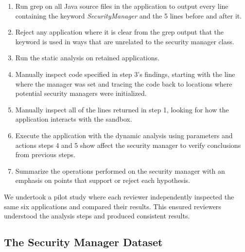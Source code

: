 \documentclass{sig-alternate}
\begin{document}
\begin{enumerate}
\item Run grep on all Java source files in the application
to output every line containing the keyword \textsl{SecurityManager} and the 5 lines before and after it.
\item Reject any application where it is clear from the grep output that the keyword is used in ways that are unrelated to the security manager class.
\item Run the static analysis on retained applications. 
\item Manually inspect code specified in step 3's findings,
starting with the line where the manager was set and tracing the code
back to locations where potential security
managers were initialized. 
\item Manually inspect all of the lines returned in step 1, looking for how the application interacts with
the sandbox. 
\item Execute the application with the dynamic analysis using parameters
and actions steps 4 and 5 show affect the security
manager to verify conclusions from previous steps.
\item Summarize the operations performed
on the security manager with an emphasis on points that support or
reject each hypothesis.
\end{enumerate}

We undertook a pilot study where each reviewer
independently inspected the same six applications and compared their
results. This ensured reviewers understood the analysis steps and produced
consistent results.

\subsection{The Security Manager Dataset}\label{sec:Applications-Studied}
\end{document}
